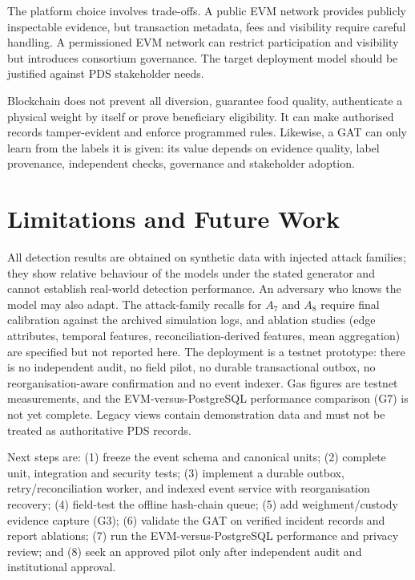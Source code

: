 \documentclass[conference,a4paper]{IEEEtran}
\begin{document}
The platform choice involves trade-offs. A public EVM network provides publicly inspectable evidence, but transaction metadata, fees and visibility require careful handling. A permissioned EVM network can restrict participation and visibility but introduces consortium governance. The target deployment model should be justified against PDS stakeholder needs.

Blockchain does not prevent all diversion, guarantee food quality, authenticate a physical weight by itself or prove beneficiary eligibility. It can make authorised records tamper-evident and enforce programmed rules. Likewise, a GAT can only learn from the labels it is given: its value depends on evidence quality, label provenance, independent checks, governance and stakeholder adoption.

\section{Limitations and Future Work}
All detection results are obtained on synthetic data with injected attack families; they show relative behaviour of the models under the stated generator and cannot establish real-world detection performance. An adversary who knows the model may also adapt. The attack-family recalls for $A_7$ and $A_8$ require final calibration against the archived simulation logs, and ablation studies (edge attributes, temporal features, reconciliation-derived features, mean aggregation) are specified but not reported here. The deployment is a testnet prototype: there is no independent audit, no field pilot, no durable transactional outbox, no reorganisation-aware confirmation and no event indexer. Gas figures are testnet measurements, and the EVM-versus-PostgreSQL performance comparison (G7) is not yet complete. Legacy views contain demonstration data and must not be treated as authoritative PDS records.

Next steps are: (1) freeze the event schema and canonical units; (2) complete unit, integration and security tests; (3) implement a durable outbox, retry/reconciliation worker, and indexed event service with reorganisation recovery; (4) field-test the offline hash-chain queue; (5) add weighment/custody evidence capture (G3); (6) validate the GAT on verified incident records and report ablations; (7) run the EVM-versus-PostgreSQL performance and privacy review; and (8) seek an approved pilot only after independent audit and institutional approval.
\end{document}
